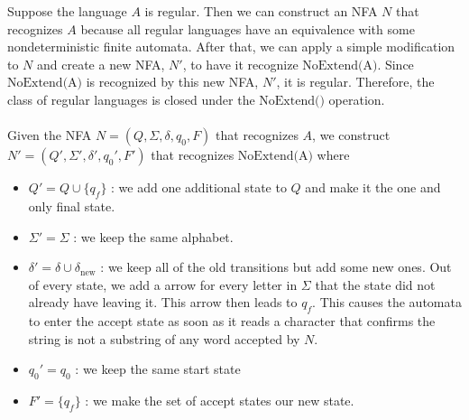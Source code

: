 \documentclass{article}
\begin{document}
Suppose the language $A$ is regular. Then we can construct an NFA $N$ that recognizes $A$ because all regular languages have an equivalence with some nondeterministic finite automata. After that, we can apply a simple modification to $N$ and create a new NFA, $N'$, to have it recognize $\textrm{NoExtend(A)}$. Since $\textrm{NoExtend(A)}$ is recognized by this new NFA, $N'$, it is regular. Therefore, the class of regular languages is closed under the $\textrm{NoExtend()}$ operation.\\\\
Given the NFA $N = (Q, \Sigma, \delta, q_0, F)$ that recognizes $A$, we construct $N' = (Q', \Sigma', \delta', q_0', F')$ that recognizes $\textrm{NoExtend(A)}$ where 
\begin{itemize}
    \item $Q' = Q \cup \{q_f\}$ : we add one additional state to $Q$ and make it the one and only final state.
    \item $\Sigma' = \Sigma$ : we keep the same alphabet.
    \item $\delta' = \delta \cup \delta_\textrm{new}$ : we keep all of the old transitions but add some new ones. Out of every state, we add a arrow for every letter in $\Sigma$ that the state did not already have leaving it. This arrow then leads to $q_f$. This causes the automata to enter the accept state as soon as it reads a character that confirms the string is not a substring of any word accepted by $N$.
    \item $q_0' = q_0$ : we keep the same start state
    \item $F' = \{q_f\}$ : we make the set of accept states our new state.
\end{itemize}
\end{document}
